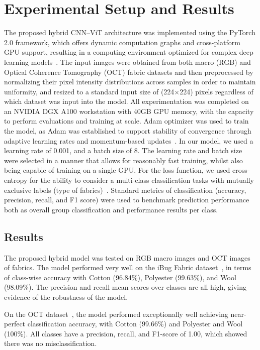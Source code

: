 \section{Experimental Setup and Results}

The proposed hybrid CNN–ViT architecture was implemented using the PyTorch 2.0 framework, which offers dynamic computation graphs and cross-platform GPU support, resulting in a computing environment optimized for complex deep learning models~\cite{paszke2019pytorch}. The input images were obtained from both macro (RGB) and Optical Coherence Tomography (OCT) fabric datasets and then preprocessed by normalizing their pixel intensity distributions across samples in order to maintain uniformity, and resized to a standard input size of (224×224) pixels regardless of which dataset was input into the model. All experimentation was completed on an NVIDIA DGX A100 workstation with 40GB GPU memory, with the capacity to perform evaluations and training at scale. Adam optimizer was used to train the model, as Adam was established to support stability of convergence through adaptive learning rates and momentum-based updates~\cite{kingma2014adam}. In our model, we used a learning rate of 0.001, and a batch size of 8. The learning rate and batch size were selected in a manner that allows for reasonably fast training, whilst also being capable of training on a single GPU. For the loss function, we used cross-entropy for the ability to consider a multi-class classification tasks with mutually exclusive labels (type of fabrics)~\cite{goodfellow2016deep}. Standard metrics of classification (accuracy, precision, recall, and F1 score) were used to benchmark prediction performance both as overall group classification and performance results per class.

\subsection{Results}

The proposed hybrid model was tested on RGB macro images and OCT images of fabrics. The model performed very well on the iBug Fabric dataset~\cite{researchgate}, in terms of class-wise accuracy with Cotton (96.84\%), Polyester (99.63\%), and Wool (98.09\%). The precision and recall mean scores over classes are all high, giving evidence of the robustness of the model.

On the OCT dataset~\cite{kampouris2016fine}, the model performed exceptionally well achieving near-perfect classification accuracy, with Cotton (99.66\%) and Polyester and Wool (100\%). All classes have a precision, recall, and F1-score of 1.00, which showed there was no misclassification.

